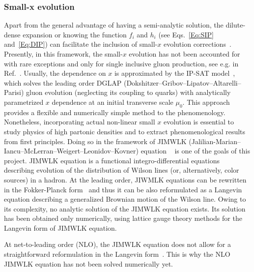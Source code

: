 \subsubsection*{Small-x evolution}
Apart from the general advantage of having a semi-analytic solution, 
the dilute-dense expansion or knowing the function $f_i$ and $h_i$ (see Eqs.~\eqref{Eq:SIP} and~\eqref{Eq:DIP}) 
can facilitate the inclusion of small-$x$ evolution corrections~\cite{Kuraev:1977fs,
Balitsky:1978ic, 
Balitsky:1997mk, 
Balitsky:1998ya, 
Kovchegov:1999yj,
Kovchegov:1999ua, 
JalilianMarian:1997dw, 
JalilianMarian:1997gr,
Iancu:2001ad, 
Iancu:2000hn}.
Presently, in this framework,  the small-$x$ evolution has not been accounted for 
with rare exceptions and only
for single inclusive gluon production, see e.g. in Ref.~\cite{Dumitru:2018iko}. 
Usually, the dependence on $x$ is approximated by the IP-SAT model~\cite{Kowalski:2003hm,Rezaeian:2012ji},
which solves the leading order  DGLAP (Dokshitzer--Gribov--Lipatov--Altarelli--Parisi)  gluon evolution (neglecting its coupling to quarks) 
with analytically parametrized $x$ dependence at an initial 
transverse scale $\mu_0$. 
This approach provides a flexible and numerically simple method 
to the phenomenology. Nonetheless, incorporating actual non-linear 
small $x$ evolution is essential to study physics 
of high partonic densities and to extract phenomenological results from first principles.  
Doing so in the framework of JIMWLK (Jalilian-Marian--Iancu--McLerran--Weigert--Leonidov--Kovner) equation 
~\cite{JalilianMarian:1997dw, 
JalilianMarian:1997gr,
Iancu:2001ad, 
Iancu:2000hn} 
is one of the goals of this project. 
JIMWLK equation is a functional integro-differential 
equations describing evolution of the distribution of Wilson lines (or, alternatively, color sources) in a 
hadron. At the leading order, JIWMLK equations can be rewritten in the Fokker-Planck form~\cite{Weigert:2000gi}
and thus it can be also reformulated as  a Langevin equation describing a generalized Brownian motion of 
the Wilson line. Owing to its complexity, no analytic solution of the JIMWLK equation exists. 
Its solution has been obtained only numerically, using lattice gauge theory methods for the
 Langevin form of JIMWLK equation.

 At net-to-leading order (NLO), the JIMWLK equation does not allow for a straightforward reformulation in the Langevin form~\cite{Kovner:2014lca,Balitsky:2013fea}. 
 This is why the NLO JIMWLK equation has not been solved numerically yet. 	





